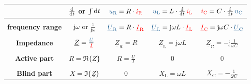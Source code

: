 \begin{frame}
\begin{table}[h]
{\begin{tabular}{ |c|c|c|c|c| }
                & $ \frac{\mathrm{d}}{\mathrm{d} t} $ or $ \int \mathrm{d} t $ 
                & $ \ecv{u_{\mathrm{R}}} = R \cdot \eci{i_{\mathrm R}} $     
                & $ \ecv{u_{\mathrm{L}}} = L \cdot \frac{\d}{\d t}\, \eci{i_{\mathrm{L}}} $ 
                & $ \eci{i_{\mathrm{C}}} = C \cdot \frac{\d}{\d t}\, \ecv{u_{\mathrm{C}}} $ \\[+4pt]
        \hline &&&&\\[-6pt]
        \textbf{frequency range}
                & $ \mathrm{j}\omega $ or $ \frac{1}{\mathrm{j}\omega} $
                & $ \ecv{\underline{U}_{\mathrm R}} = R                   \cdot \eci{\underline{I}_{\mathrm R}} $ 
                & $ \ecv{\underline{U}_{\mathrm L}} = \mathrm{j}\omega L  \cdot \eci{\underline{I}_{\mathrm L}} $
                & $ \eci{\underline{I}_{\mathrm C}} = \mathrm{j}\omega C  \cdot \ecv{\underline{U}_{\mathrm C}} $ \\[+4pt]
        \hline &&&&\\[-6pt]
        \textbf{Impedance}
                & $ \underline{Z} = \frac{\ecv{\underline{U}}}{\eci{\underline{I}}} $
                & $ \underline{Z}_{\mathrm R} = R $ 
                & $ \underline{Z}_{\mathrm L} = \mathrm{j}\omega L $
                & $ \underline{Z}_{\mathrm C} = -\mathrm{j}\frac{1}{\omega C} $ \\[+4pt]
        \hline &&&&\\[-6pt]
        \textbf{Active part}
                & $ R = \Re\{\underline{Z}\} $
                & $ R = \frac{U}{I} $
                & $ 0 $
                & $ 0 $ \\[+4pt]
                \hline &&&&\\[-6pt]
        \textbf{Blind part}
                & $ X = \Im\{\underline{Z}\} $
                & $ 0 $
                & $ X_{\mathrm L} = \omega L $
                & $ X_{\mathrm C} = -\frac{1}{\omega C}$ \\[+4pt]
        \hline
    \end{tabular}
    } %
    \end{table}
    
\end{frame}


